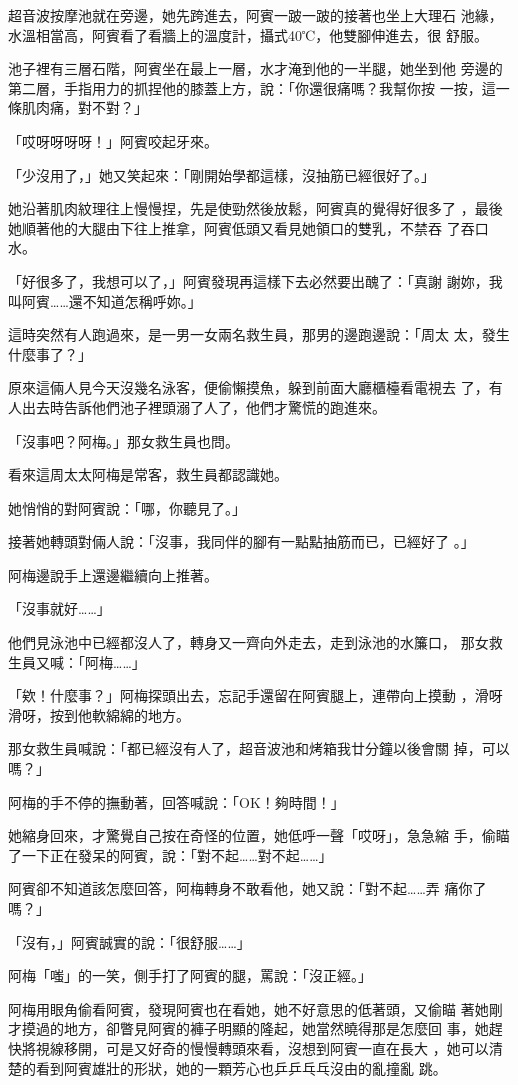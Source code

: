超音波按摩池就在旁邊，她先跨進去，阿賓一跛一跛的接著也坐上大理石
池緣，水溫相當高，阿賓看了看牆上的溫度計，攝式40℃，他雙腳伸進去，很
舒服。

池子裡有三層石階，阿賓坐在最上一層，水才淹到他的一半腿，她坐到他
旁邊的第二層，手指用力的抓捏他的膝蓋上方，說：「你還很痛嗎？我幫你按
一按，這一條肌肉痛，對不對？」

「哎呀呀呀呀！」阿賓咬起牙來。

「少沒用了，」她又笑起來：「剛開始學都這樣，沒抽筋已經很好了。」

她沿著肌肉紋理往上慢慢捏，先是使勁然後放鬆，阿賓真的覺得好很多了
，最後她順著他的大腿由下往上推拿，阿賓低頭又看見她領口的雙乳，不禁吞
了吞口水。

「好很多了，我想可以了，」阿賓發現再這樣下去必然要出醜了：「真謝
謝妳，我叫阿賓……還不知道怎稱呼妳。」

這時突然有人跑過來，是一男一女兩名救生員，那男的邊跑邊說：「周太
太，發生什麼事了？」

原來這倆人見今天沒幾名泳客，便偷懶摸魚，躲到前面大廳櫃檯看電視去
了，有人出去時告訴他們池子裡頭溺了人了，他們才驚慌的跑進來。

「沒事吧？阿梅。」那女救生員也問。

看來這周太太阿梅是常客，救生員都認識她。

她悄悄的對阿賓說：「哪，你聽見了。」

接著她轉頭對倆人說：「沒事，我同伴的腳有一點點抽筋而已，已經好了
。」

阿梅邊說手上還邊繼續向上推著。

「沒事就好……」

他們見泳池中已經都沒人了，轉身又一齊向外走去，走到泳池的水簾口，
那女救生員又喊：「阿梅……」

「欸！什麼事？」阿梅探頭出去，忘記手還留在阿賓腿上，連帶向上摸動
，滑呀滑呀，按到他軟綿綿的地方。

那女救生員喊說：「都已經沒有人了，超音波池和烤箱我廿分鐘以後會關
掉，可以嗎？」

阿梅的手不停的撫動著，回答喊說：「OK！夠時間！」

她縮身回來，才驚覺自己按在奇怪的位置，她低呼一聲「哎呀」，急急縮
手，偷瞄了一下正在發呆的阿賓，說：「對不起……對不起……」

阿賓卻不知道該怎麼回答，阿梅轉身不敢看他，她又說：「對不起……弄
痛你了嗎？」

「沒有，」阿賓誠實的說：「很舒服……」

阿梅「嗤」的一笑，側手打了阿賓的腿，罵說：「沒正經。」

阿梅用眼角偷看阿賓，發現阿賓也在看她，她不好意思的低著頭，又偷瞄
著她剛才摸過的地方，卻瞥見阿賓的褲子明顯的隆起，她當然曉得那是怎麼回
事，她趕快將視線移開，可是又好奇的慢慢轉頭來看，沒想到阿賓一直在長大
，她可以清楚的看到阿賓雄壯的形狀，她的一顆芳心也乒乒乓乓沒由的亂撞亂
跳。

